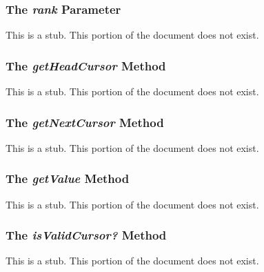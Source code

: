\subsubsection{The {\em rank} Parameter}
\label{The_em_rank_Parameter}

This is a stub.  This portion of the document does not exist.

\subsubsection{The {\em getHeadCursor} Method}
\label{The_em_getHeadCursor_Method}

This is a stub.  This portion of the document does not exist.

\subsubsection{The {\em getNextCursor} Method}
\label{The_em_getNextCursor_Method}

This is a stub.  This portion of the document does not exist.

\subsubsection{The {\em getValue} Method}
\label{The_em_getValue_Method}

This is a stub.  This portion of the document does not exist.

\subsubsection{The {\em isValidCursor?} Method}
\label{The_em_isValidCursorQ_Method}

This is a stub.  This portion of the document does not exist.
